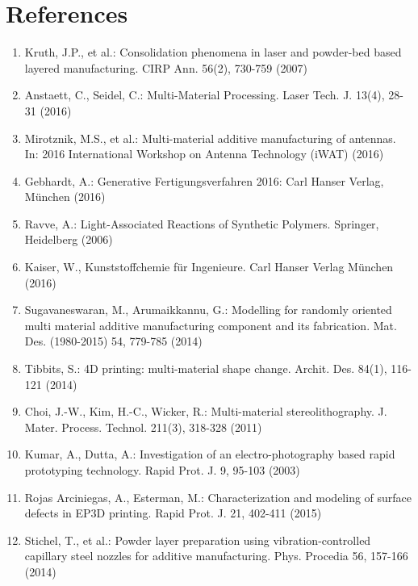 \documentclass[10pt]{article}
\begin{document}
\section*{References}
\begin{enumerate}
  \item Kruth, J.P., et al.: Consolidation phenomena in laser and powder-bed based layered manufacturing. CIRP Ann. 56(2), 730-759 (2007)

  \item Anstaett, C., Seidel, C.: Multi-Material Processing. Laser Tech. J. 13(4), 28-31 (2016)

  \item Mirotznik, M.S., et al.: Multi-material additive manufacturing of antennas. In: 2016 International Workshop on Antenna Technology (iWAT) (2016)

  \item Gebhardt, A.: Generative Fertigungsverfahren 2016: Carl Hanser Verlag, München (2016)

  \item Ravve, A.: Light-Associated Reactions of Synthetic Polymers. Springer, Heidelberg (2006)

  \item Kaiser, W., Kunststoffchemie für Ingenieure. Carl Hanser Verlag München (2016)

  \item Sugavaneswaran, M., Arumaikkannu, G.: Modelling for randomly oriented multi material additive manufacturing component and its fabrication. Mat. Des. (1980-2015) 54, 779-785 (2014)

  \item Tibbits, S.: 4D printing: multi-material shape change. Archit. Des. 84(1), 116-121 (2014)

  \item Choi, J.-W., Kim, H.-C., Wicker, R.: Multi-material stereolithography. J. Mater. Process. Technol. 211(3), 318-328 (2011)

  \item Kumar, A., Dutta, A.: Investigation of an electro-photography based rapid prototyping technology. Rapid Prot. J. 9, 95-103 (2003)

  \item Rojas Arciniegas, A., Esterman, M.: Characterization and modeling of surface defects in EP3D printing. Rapid Prot. J. 21, 402-411 (2015)

  \item Stichel, T., et al.: Powder layer preparation using vibration-controlled capillary steel nozzles for additive manufacturing. Phys. Procedia 56, 157-166 (2014)


\end{enumerate}
\end{document}
